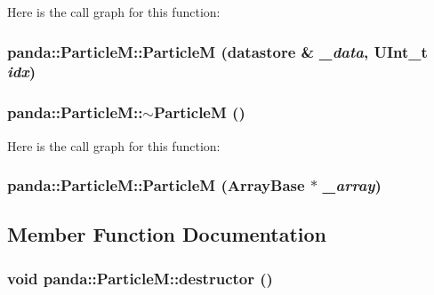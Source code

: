Here is the call graph for this function:\hypertarget{classpanda_1_1ParticleM_ad6374154fe587a4e4fbd6eb5eb3957a0}{
\subsubsection[{ParticleM}]{\setlength{\rightskip}{0pt plus 5cm}panda::ParticleM::ParticleM ({\bf datastore} \& {\em \_\-data}, \/  UInt\_\-t {\em idx})}}
\label{classpanda_1_1ParticleM_ad6374154fe587a4e4fbd6eb5eb3957a0}
\hypertarget{classpanda_1_1ParticleM_a887046812b7972d5c76d0440d04a6f0a}{
\subsubsection[{$\sim$ParticleM}]{\setlength{\rightskip}{0pt plus 5cm}panda::ParticleM::$\sim$ParticleM ()}}
\label{classpanda_1_1ParticleM_a887046812b7972d5c76d0440d04a6f0a}


Here is the call graph for this function:\hypertarget{classpanda_1_1ParticleM_a591019bfbe692da09fbf9c4aa3e5e4d5}{
\subsubsection[{ParticleM}]{\setlength{\rightskip}{0pt plus 5cm}panda::ParticleM::ParticleM ({\bf ArrayBase} $\ast$ {\em \_\-array})}}
\label{classpanda_1_1ParticleM_a591019bfbe692da09fbf9c4aa3e5e4d5}


\subsection{Member Function Documentation}
\hypertarget{classpanda_1_1ParticleM_abef15d28e6e33ee92c0b318bd41af2ca}{
\subsubsection[{destructor}]{\setlength{\rightskip}{0pt plus 5cm}void panda::ParticleM::destructor ()}}
\label{classpanda_1_1ParticleM_abef15d28e6e33ee92c0b318bd41af2ca}


